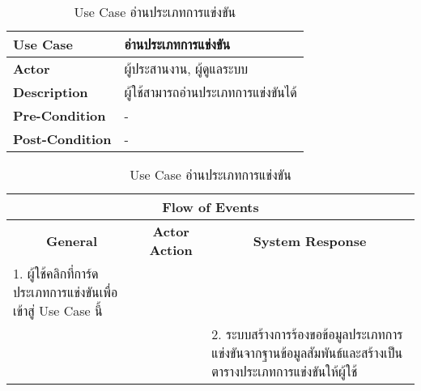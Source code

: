 \begin{table}[H]
    \caption{Use Case อ่านประเภทการแข่งขัน}
    \label{tab:use-case-read-contest}
    \begin{tabularx}{\textwidth}{ | p{3cm} | X | }
    \hline
    \textbf{Use Case} & อ่านประเภทการแข่งขัน \\
    \hline
    \textbf{Actor} & ผู้ประสานงาน, ผู้ดูแลระบบ \\
    \hline
    \textbf{Description} & ผู้ใช้สามารถอ่านประเภทการแข่งขันได้ \\
    \hline
    \textbf{Pre-Condition} & - \\
    \hline
    \textbf{Post-Condition} & - \\
    \hline
    \end{tabularx}
    \begin{tabularx}{\textwidth}{ | X | X | X | }
    \multicolumn{3}{|c|}{\textbf{Flow of Events}} \\
    \hline
    \multicolumn{1}{|c|}{\textbf{General}} & \multicolumn{1}{|c|}{\textbf{Actor Action}} & \multicolumn{1}{|c|}{\textbf{System Response}} \\
    \hline
    1. ผู้ใช้คลิกที่การ์ดประเภทการแข่งขันเพื่อเข้าสู่ Use Case นี้ &  &  \\
    \hline
    & & 2. ระบบสร้างการร้องขอข้อมูลประเภทการแข่งขันจากฐานข้อมูลสัมพันธ์และสร้างเป็นตารางประเภทการแข่งขันให้ผู้ใช้ \\
    \hline
    \end{tabularx}
\end{table}

